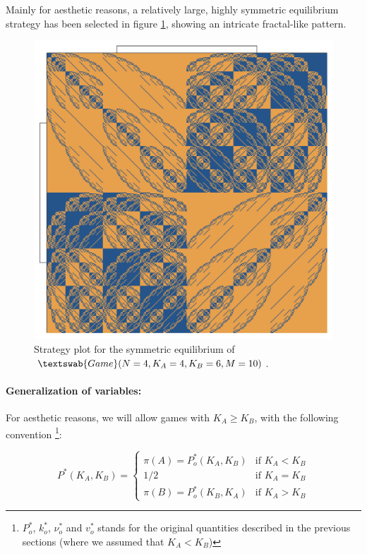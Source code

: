 \documentclass{article}
\theoremstyle{definition}
\newcommand{\G}[1]{$\textswab{Game}(#1)$}
\begin{document}
Mainly for aesthetic reasons, a relatively large, highly symmetric equilibrium strategy has been selected in figure \ref{fig:StrategyPlot_G_4_4_6_10}, showing an intricate fractal-like pattern.

\begin{figure}[H]
    \centering
    \includegraphics[width=12 cm]{img/StrategyPlot_4_4_6_10.pdf}
    \caption{Strategy plot for the symmetric equilibrium of \G{N=4,K_A=4,K_B=6,M=10}.}
    \label{fig:StrategyPlot_G_4_4_6_10}
\end{figure}

\paragraph{Generalization of variables:}

For aesthetic reasons, we will allow games with $K_A \ge K_B$, with the following convention \footnote{$P^*_o$, $k^*_o$, $\nu^*_o$ and $v^*_o$ stands for the original quantities described in the previous sections (where we assumed that $K_A<K_B$)}:

\begin{equation}
\label{eq:PKAKBextended}
    P^*(K_A,K_B) =
        \begin{cases}
        \pi(A) = P^*_o(K_A,K_B) & \text{if } K_A < K_B \\
        1/2                     & \text{if } K_A = K_B \\
        \pi(B) = P^*_o(K_B,K_A) & \text{if } K_A > K_B
    \end{cases}
\end{equation}
\end{document}
